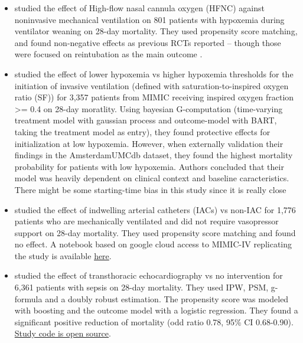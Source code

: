 \documentclass[french,12pt,twoside,a4paper]{book}
\begin{document}
\begin{appendices}
\begin{itemize}
    \item \cite{liu2021effects} studied the effect of \textcolor{I}{High-flow
            nasal cannula oxygen (HFNC)} against \textcolor{C}{noninvasive
            mechanical ventilation} on \textcolor{P}{801 patients with hypoxemia
            during ventilator weaning} on \textcolor{O}{28-day mortality}. They
          used propensity score matching, and found non-negative effects as
          previous RCTs reported -- though those were focused on reintubation as the
          main outcome \citep{stephan2015high, hernandez2016effect}.

    \item \cite{yarnell2023oxygenation} studied the effect of \textcolor{I}{lower hypoxemia} vs \textcolor{C}{higher
          hypoxemia thresholds for the initiation of invasive ventilation} (defined with saturation-to-inspired oxygen ratio (SF)) for
          \textcolor{P}{3,357 patients from MIMIC receiving inspired oxygen fraction >= 0.4} on \textcolor{O}{28-day
            moratlity}. Using bayesian G-computation (time-varying treatment model with
          gaussian process and outcome-model with BART, taking the treatment model as
          entry), they found protective effects for initialization at low hypoxemia.
          However, when externally validation their findings in the AmsterdamUMCdb dataset,
          they found the highest mortality probability for patients with low hypoxemia.
          Authors concluded that their model was heavily dependent on clinical context
          and baseline caracteristics. There might be some starting-time bias in this study since it is really close

    \item \cite{hsu2015association} studied the effect of \textcolor{I}{indwelling
            arterial catheters (IACs)} vs \textcolor{C}{non-IAC} for
          \textcolor{P}{1,776 patients who are mechanically ventilated and did
            not require vasopressor support} on \textcolor{O}{28-day mortality}.
          They used propensity score matching and found no effect. A notebook based on google cloud access to MIMIC-IV
          replicating the study is available \href{https://github.com/alistairewj/mimic-iv-aline-study/blob/main/mimic_iv_aline.ipynb}{here}.

    \item \cite{feng2018transthoracic} studied the effect of
          \textcolor{I}{transthoracic echocardiography} vs \textcolor{C}{no
            intervention} for \textcolor{P}{6,361 patients with sepsis} on
          \textcolor{O}{28-day mortality}. They used IPW, PSM, g-formula and a
          doubly robust estimation. The propensity score was modeled with boosting
          and the outcome model with a logistic regression. They
          found a significant positive reduction of mortality (odd ratio 0.78, 95\% CI 0.68-0.90).
          \href{https://github.com/nus-mornin-lab/echo-mimiciii}{Study code is
            open source}.


\end{itemize}
\end{appendices}
\end{document}
